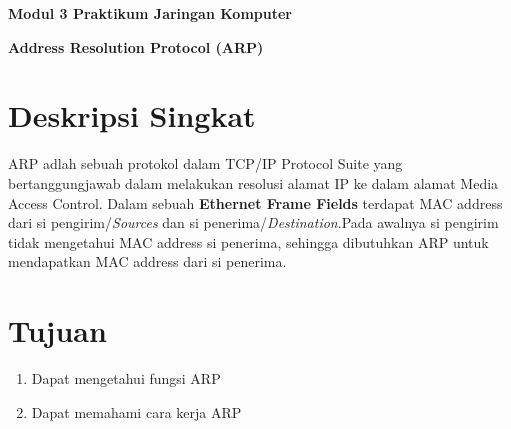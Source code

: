 \documentclass{article}
\begin{document}
    \begin{center}
        \textbf{Modul 3 Praktikum Jaringan Komputer}

        \textbf{Address Resolution Protocol (ARP)}
    \end{center}

    \section*{Deskripsi Singkat}
    ARP adlah sebuah protokol dalam TCP/IP Protocol Suite yang bertanggungjawab dalam melakukan resolusi alamat IP ke dalam alamat Media Access Control. 
    Dalam sebuah \textbf{Ethernet Frame Fields} terdapat MAC address dari si pengirim/\textit{Sources} dan si penerima/\textit{Destination}.Pada awalnya si pengirim tidak mengetahui MAC address si penerima, sehingga dibutuhkan ARP untuk mendapatkan MAC address dari si penerima.

    \section*{Tujuan}
    \begin{enumerate}
        \item Dapat mengetahui fungsi ARP
        \item Dapat memahami cara kerja ARP
    \end{enumerate}
\end{document}
